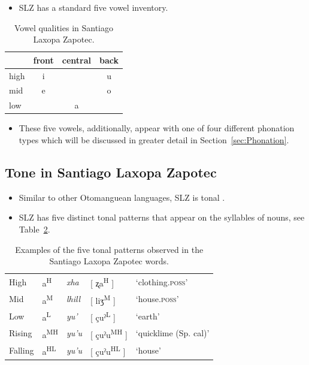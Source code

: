 \documentclass[12pt, letterpaper]{article}
\newcommand{\supr}[1]{\textsuperscript{#1}}
\providecommand{\lsptoprule}{\midrule\toprule}
\providecommand{\lspbottomrule}{\bottomrule\midrule}
\begin{document}
\begin{itemize}
    \item SLZ has a standard five vowel inventory. 
\end{itemize}

\begin{table}[!h]
	\centering
	\caption{Vowel qualities in Santiago Laxopa Zapotec.}
    \label{tab:SLZvowels}
	\begin{tabular}{lccc}
	\lsptoprule
	&  front& central  & back \\
	\midrule
	high   	&  i  &     &   u \\
	mid    	&  e  &   	& 	o \\
	low   	&     &  a 	&	  \\
	\lspbottomrule
	\end{tabular}
\end{table}

\begin{itemize}
	\item These five vowels, additionally, appear with one of four different phonation types which will be discussed in greater detail in Section~\ref{sec:Phonation}.
\end{itemize}

\subsection{Tone in Santiago Laxopa Zapotec} \label{sec:Tone}

\begin{itemize}
    \item Similar to other Otomanguean languages, SLZ is tonal \citep{suarezMesoamericanIndianLanguages1983,campbellMesoAmericaLinguisticArea1986,silvermanLaryngealComplexityOtomanguean1997,campbellOtomangueanHistoricalLinguistics2017a,campbellOtomangueanHistoricalLinguistics2017}.
    \item SLZ has five distinct tonal patterns that appear on the syllables of nouns, see Table~\ref{tab:tones}. 
\end{itemize}

\begin{table}[!h]
	\centering
	\caption{Examples of the five tonal patterns observed in the Santiago Laxopa Zapotec words.}
	\label{tab:tones}
	\begin{tabular}{lllll}
	\lsptoprule
	High   	&  a\supr{H}  &  \textit{xha}   &  [ ʐa\supr{H} ] & `clothing.\textsc{poss}'\\
	Mid    	&  a\supr{M}  &  \textit{lhill} 	& [ liʒ\supr{M} ] & `house.\textsc{poss}' \\
	Low   	&  a\supr{L}  &  \textit{yu'} 	&	 [ çuˀ\supr{L} ] & `earth'\\
	Rising	&  a\supr{MH}  &  \textit{yu'u} 	&	[ çuˀu\supr{MH} ] & `quicklime (Sp. cal)' \\
	Falling &  a\supr{HL}  &  \textit{yu'u}  &	[ çuˀu\supr{HL} ] &	`house' \\
	\lspbottomrule
	\end{tabular}
\end{table}
\end{document}
